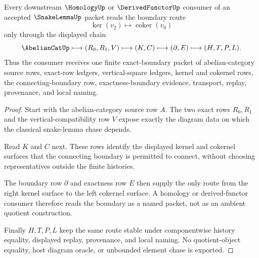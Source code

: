 \begin{theorem}
\label{thm:snake-lemma-exact-boundary}
Every downstream $\HomologyUp$ or $\DerivedFunctorUp$ consumer of an accepted $\SnakeLemmaUp$ packet reads the boundary route
$$
\ker(v_2)\longmapsto \operatorname{coker}(v_0)
$$
only through the displayed chain
$$
\AbelianCatUp \longmapsto (R_0,R_1,V) \longmapsto (K,C) \longmapsto (\partial,E) \longmapsto (H,T,P,L).
$$
Thus the consumer receives one finite exact-boundary packet of abelian-category source rows, exact-row ledgers, vertical-square ledgers, kernel and cokernel rows, the connecting-boundary row, exactness-boundary evidence, transport, replay, provenance, and local naming.
\end{theorem}
\begin{proof}
Start with the abelian-category source row $A$. The two exact rows $R_0,R_1$ and the vertical-compatibility row $V$ expose exactly the diagram data on which the classical snake-lemma chase depends.

Read $K$ and $C$ next. These rows identify the displayed kernel and cokernel surfaces that the connecting boundary is permitted to connect, without choosing representatives outside the finite histories.

The boundary row $\partial$ and exactness row $E$ then supply the only route from the right kernel surface to the left cokernel surface. A homology or derived-functor consumer therefore reads the boundary as a named packet, not as an ambient quotient construction.

Finally $H,T,P,L$ keep the same route stable under componentwise history equality, displayed replay, provenance, and local naming. No quotient-object equality, host diagram oracle, or unbounded element chase is exported.
\end{proof}


